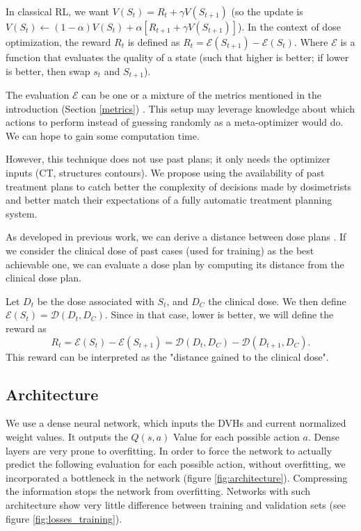In classical RL, we want $V(S_t) = R_t + \gamma V(S_{t+1})$
(so the update is $V(S_t) \leftarrow (1-\alpha) V(S_t) + \alpha \left[ R_{t+1} + \gamma V(S_{t+1}) \right]$).
In the context of dose optimization, the reward $R_t$ is defined as $R_t = \mathcal{E}(S_{t+1}) - \mathcal{E}(S_t)$.
Where $\mathcal{E}$ is a function that evaluates the quality of a state (such that higher is better; if lower is better, then swap $s_t$ and $S_{t+1}$).

The evaluation $\mathcal{E}$ can be one or a mixture of the metrics mentioned in the introduction (Section \ref{metrics}) \cite{shen_hierarchical_2021} \cite{shen_intelligent_2019} \cite{moreau_reinforcement_2021}.
This setup may leverage knowledge about which actions to perform instead of guessing randomly as a meta-optimizer would do.
We can hope to gain some computation time.

However, this technique does not use past plans; it only needs the optimizer inputs (CT, structures contours).
We propose using the availability of past treatment plans to catch better the complexity of decisions made by dosimetrists and better match their expectations of a fully automatic treatment planning system.

As developed in previous work, we can derive a distance between dose plans \cite{paul_dubois_novel_2024}.
If we consider the clinical dose of past cases (used for training) as the best achievable one, we can evaluate a dose plan by computing its distance from the clinical dose plan.

Let $D_t$ be the dose associated with $S_t$, and $D_C$ the clinical dose.
We then define $\mathcal{E}(S_t) = \mathcal{D}(D_t, D_C)$.
Since in that case, lower is better, we will define the reward as $$R_t = \mathcal{E}(S_t) - \mathcal{E}(S_{t+1}) = \mathcal{D}(D_t, D_C) - \mathcal{D}(D_{t+1}, D_C).$$
This reward can be interpreted as the "distance gained to the clinical dose".

\subsection{Architecture}
We use a dense neural network, which inputs the DVHs and current normalized weight values.
It outputs the $Q(s, a)$ Value for each possible action $a$.
Dense layers are very prone to overfitting.
In order to force the network to actually predict the following evaluation for each possible action, without overfitting, we incorporated a bottleneck in the network (figure \ref{fig:architecture}).
Compressing the information stops the network from overfitting.
Networks with such architecture show very little difference between training and validation sets (see figure \ref{fig:losses_training}).

